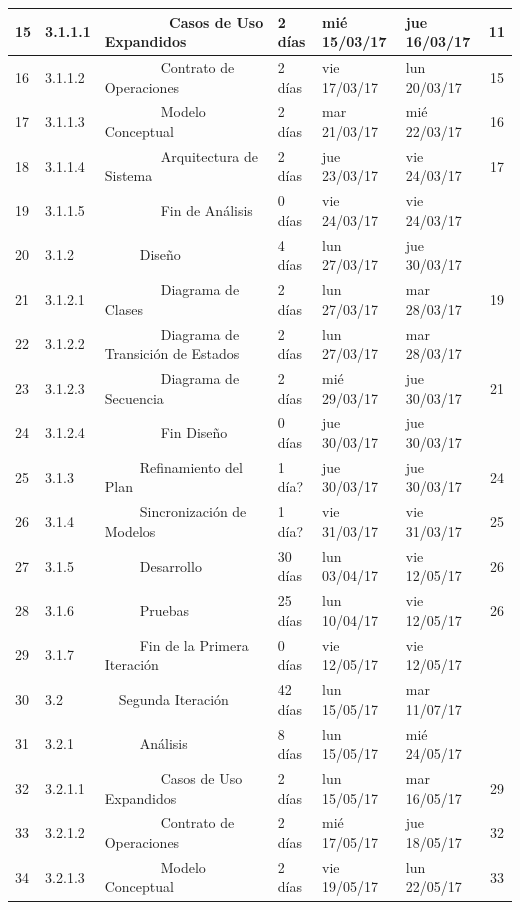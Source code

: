 \begin{center}
\begin{longtable}{  l  l  l  l  l  l  c  }
	15 & 3.1.1.1 &         Casos de Uso Expandidos & 2 días & mié 15/03/17 & jue 16/03/17 & 11 \\ \hline
	16 & 3.1.1.2 &         Contrato de Operaciones & 2 días & vie 17/03/17 & lun 20/03/17 & 15 \\ \hline
	17 & 3.1.1.3 &         Modelo Conceptual & 2 días & mar 21/03/17 & mié 22/03/17 & 16 \\ \hline
	18 & 3.1.1.4 &         Arquitectura de Sistema & 2 días & jue 23/03/17 & vie 24/03/17 & 17 \\ \hline
	19 & 3.1.1.5 &         Fin de Análisis & 0 días & vie 24/03/17 & vie 24/03/17 &  \\ \hline
	20 & 3.1.2 &      Diseño & 4 días & lun 27/03/17 & jue 30/03/17 &  \\ \hline
	21 & 3.1.2.1 &         Diagrama de Clases & 2 días & lun 27/03/17 & mar 28/03/17 & 19 \\ \hline
	22 & 3.1.2.2 &         Diagrama de Transición de Estados & 2 días & lun 27/03/17 & mar 28/03/17 &  \\ \hline
	23 & 3.1.2.3 &         Diagrama de Secuencia & 2 días & mié 29/03/17 & jue 30/03/17 & 21 \\ \hline
	24 & 3.1.2.4 &         Fin Diseño & 0 días & jue 30/03/17 & jue 30/03/17 &  \\ \hline
	25 & 3.1.3 &      Refinamiento del Plan & 1 día? & jue 30/03/17 & jue 30/03/17 & 24 \\ \hline
	26 & 3.1.4 &      Sincronización de Modelos & 1 día? & vie 31/03/17 & vie 31/03/17 & 25 \\ \hline
	27 & 3.1.5 &      Desarrollo & 30 días & lun 03/04/17 & vie 12/05/17 & 26 \\ \hline
	28 & 3.1.6 &      Pruebas & 25 días & lun 10/04/17 & vie 12/05/17 & 26 \\ \hline
	29 & 3.1.7 &      Fin de la Primera Iteración & 0 días & vie 12/05/17 & vie 12/05/17 &  \\ \hline
	30 & 3.2 &   Segunda Iteración & 42 días & lun 15/05/17 & mar 11/07/17 &  \\ \hline
	31 & 3.2.1 &      Análisis & 8 días & lun 15/05/17 & mié 24/05/17 &  \\ \hline
	32 & 3.2.1.1 &         Casos de Uso Expandidos & 2 días & lun 15/05/17 & mar 16/05/17 & 29 \\ \hline
	33 & 3.2.1.2 &         Contrato de Operaciones & 2 días & mié 17/05/17 & jue 18/05/17 & 32 \\ \hline
	34 & 3.2.1.3 &         Modelo Conceptual & 2 días & vie 19/05/17 & lun 22/05/17 & 33 \\ \hline

\end{longtable}
\end{center}
